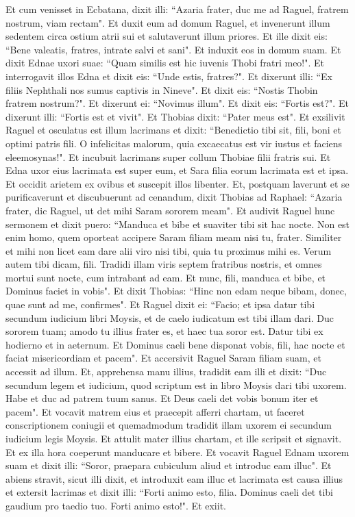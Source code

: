 \begin{biblechapter}  
\verse Et cum venisset in Ecbatana, dixit illi: “Azaria frater, duc me ad Raguel, fratrem nostrum, viam rectam". Et duxit eum ad domum Raguel, et invenerunt illum sedentem circa ostium atrii sui et salutaverunt illum priores. Et ille dixit eis: “Bene valeatis, fratres, intrate salvi et sani". Et induxit eos in domum suam. 
\verse Et dixit Ednae uxori suae: “Quam similis est hic iuvenis Thobi fratri meo!". 
\verse Et interrogavit illos Edna et dixit eis: “Unde estis, fratres?". Et dixerunt illi: “Ex filiis Nephthali nos sumus captivis in Nineve". 
\verse Et dixit eis: “Nostis Thobin fratrem nostrum?". Et dixerunt ei: “Novimus illum". Et dixit eis: “Fortis est?". 
\verse Et dixerunt illi: “Fortis est et vivit". Et Thobias dixit: “Pater meus est". 
\verse Et exsilivit Raguel et osculatus est illum lacrimans 
\verse et dixit: “Benedictio tibi sit, fili, boni et optimi patris fili. O infelicitas malorum, quia excaecatus est vir iustus et faciens eleemosynas!". Et incubuit lacrimans super collum Thobiae filii fratris sui. 
\verse Et Edna uxor eius lacrimata est super eum, et Sara filia eorum lacrimata est et ipsa. 
\verse Et occidit arietem ex ovibus et suscepit illos libenter. Et, postquam laverunt et se purificaverunt et discubuerunt ad cenandum, dixit Thobias ad Raphael: “Azaria frater, dic Raguel, ut det mihi Saram sororem meam". 
\verse Et audivit Raguel hunc sermonem et dixit puero: “Manduca et bibe et suaviter tibi sit hac nocte. Non est enim homo, quem oporteat accipere Saram filiam meam nisi tu, frater. Similiter et mihi non licet eam dare alii viro nisi tibi, quia tu proximus mihi es. Verum autem tibi dicam, fili. 
\verse Tradidi illam viris septem fratribus nostris, et omnes mortui sunt nocte, cum intrabant ad eam. Et nunc, fili, manduca et bibe, et Dominus faciet in vobis". Et dixit Thobias: “Hinc non edam neque bibam, donec, quae sunt ad me, confirmes". Et Raguel dixit ei: “Facio; et ipsa datur tibi secundum iudicium libri Moysis, et de caelo iudicatum est tibi illam dari. Duc sororem tuam; amodo tu illius frater es, et haec tua soror est. Datur tibi ex hodierno et in aeternum. Et Dominus caeli bene disponat vobis, fili, hac nocte et faciat misericordiam et pacem". 
\verse Et accersivit Raguel Saram filiam suam, et accessit ad illum. Et, apprehensa manu illius, tradidit eam illi et dixit: “Duc secundum legem et iudicium, quod scriptum est in libro Moysis dari tibi uxorem. Habe et duc ad patrem tuum sanus. Et Deus caeli det vobis bonum iter et pacem". 
\verse Et vocavit matrem eius et praecepit afferri chartam, ut faceret conscriptionem coniugii et quemadmodum tradidit illam uxorem ei secundum iudicium legis Moysis. Et attulit mater illius chartam, et ille scripsit et signavit. 
\verse Et ex illa hora coeperunt manducare et bibere.  
\verse Et vocavit Raguel Ednam uxorem suam et dixit illi: “Soror, praepara cubiculum aliud et introduc eam illuc". 
\verse Et abiens stravit, sicut illi dixit, et introduxit eam illuc et lacrimata est causa illius et extersit lacrimas et dixit illi: 
\verse “Forti animo esto, filia. Dominus caeli det tibi gaudium pro taedio tuo. Forti animo esto!". Et exiit. 
\end{biblechapter}

